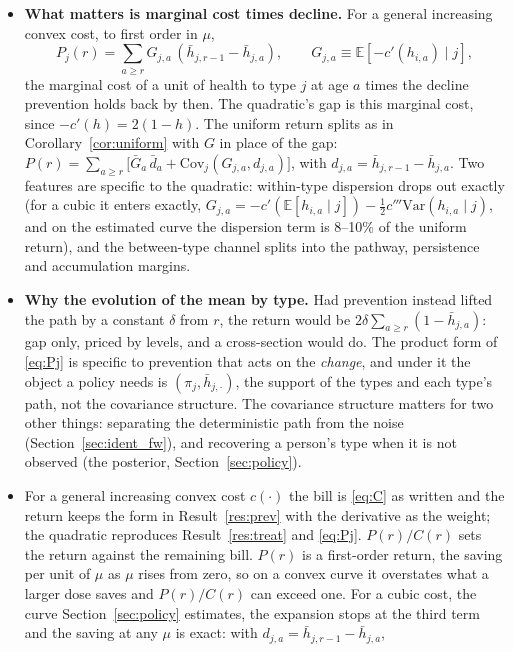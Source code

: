 \documentclass[11pt]{article}
\newcommand{\E}{\mathbb{E}}
\newcommand{\Var}{\mathrm{Var}}
\newcommand{\Cov}{\mathrm{Cov}}
\begin{document}
	\begin{itemize}
		\item \textbf{What matters is marginal cost times decline.} For a general increasing convex cost, to first order in $\mu$,
		\begin{equation}
			P_j(r)=\sum_{a\ge r}G_{j,a}\,(\bar h_{j,r-1}-\bar h_{j,a}),\qquad G_{j,a}\equiv\E[-c'(h_{i,a})\mid j],
			\label{eq:Pj_general}
		\end{equation}
		the marginal cost of a unit of health to type $j$ at age $a$ times the decline prevention holds back by then. The quadratic's gap is this marginal cost, since $-c'(h)=2(1-h)$. The uniform return splits as in Corollary~\ref{cor:uniform} with $G$ in place of the gap: $P(r)=\sum_{a\ge r}\bigl[\bar G_a\,\bar d_a+\Cov_j(G_{j,a},d_{j,a})\bigr]$, with $d_{j,a}=\bar h_{j,r-1}-\bar h_{j,a}$. Two features are specific to the quadratic: within-type dispersion drops out exactly (for a cubic it enters exactly, $G_{j,a}=-c'(\E[h_{i,a}\mid j])-\tfrac12c'''\Var(h_{i,a}\mid j)$, and on the estimated curve the dispersion term is 8--10\% of the uniform return), and the between-type channel splits into the pathway, persistence and accumulation margins.
		\item \textbf{Why the evolution of the mean by type.} Had prevention instead lifted the path by a constant $\delta$ from $r$, the return would be $2\delta\sum_{a\ge r}(1-\bar h_{j,a})$: gap only, priced by levels, and a cross-section would do. The product form of \eqref{eq:Pj} is specific to prevention that acts on the \emph{change}, and under it the object a policy needs is $(\pi_j,\bar h_{j,\cdot})$, the support of the types and each type's path, not the covariance structure. The covariance structure matters for two other things: separating the deterministic path from the noise (Section~\ref{sec:ident_fw}), and recovering a person's type when it is not observed (the posterior, Section~\ref{sec:policy}).
		\item For a general increasing convex cost $c(\cdot)$ the bill is \eqref{eq:C} as written and the return keeps the form in Result~\ref{res:prev} with the derivative as the weight; the quadratic reproduces Result~\ref{res:treat} and \eqref{eq:Pj}. $P(r)/C(r)$ sets the return against the remaining bill. $P(r)$ is a first-order return, the saving per unit of $\mu$ as $\mu$ rises from zero, so on a convex curve it overstates what a larger dose saves and $P(r)/C(r)$ can exceed one. For a cubic cost, the curve Section~\ref{sec:policy} estimates, the expansion stops at the third term and the saving at any $\mu$ is exact: with $d_{j,a}=\bar h_{j,r-1}-\bar h_{j,a}$,

\end{itemize}
\end{document}
